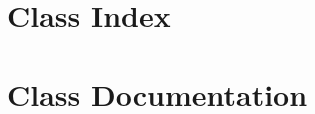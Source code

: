 
\newcommand\tab[1][1cm]{\hspace*{#1}}

\chapter{Class Index}

\chapter{Class Documentation}
%









